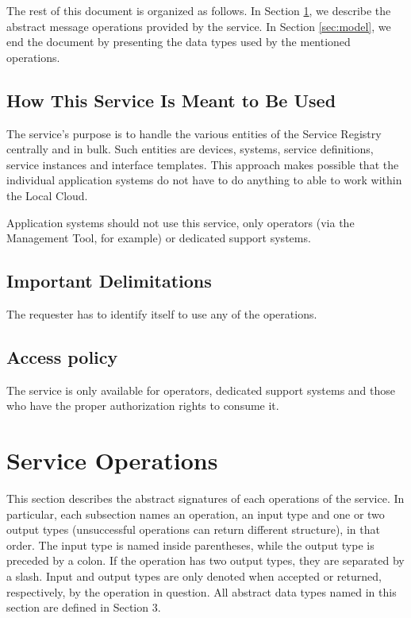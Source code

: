 \documentclass[a4paper]{arrowhead}
\begin{document}
The rest of this document is organized as follows.
In Section \ref{sec:functions}, we describe the abstract message operations provided by the service.
In Section \ref{sec:model}, we end the document by presenting the data types used by the mentioned operations.

\subsection{How This Service Is Meant to Be Used}
The service's purpose is to handle the various entities of the Service Registry centrally and in bulk. Such entities are devices, systems, service definitions, service instances and interface templates. This approach makes possible that the individual application systems do not have to do anything to able to work within the Local Cloud.

Application systems should not use this service, only operators (via the Management Tool, for example) or dedicated support systems.

\subsection{Important Delimitations}
\label{sec:delimitations}

The requester has to identify itself to use any of the operations.

\subsection{Access policy}
\label{sec:accesspolicy}

The service is only available for operators, dedicated support systems and those who have the proper authorization rights to consume it.

\newpage

\section{Service Operations}
\label{sec:functions}

This section describes the abstract signatures of each operations of the service. 
In particular, each subsection names an operation, an input type and one or two output types (unsuccessful operations can return different structure), in that order.
The input type is named inside parentheses, while the output type is preceded by a colon. If the operation has two output types, they are separated by a slash.
Input and output types are only denoted when accepted or returned, respectively, by the operation in question. All abstract data types named in this section are defined in Section 3.
\end{document}
